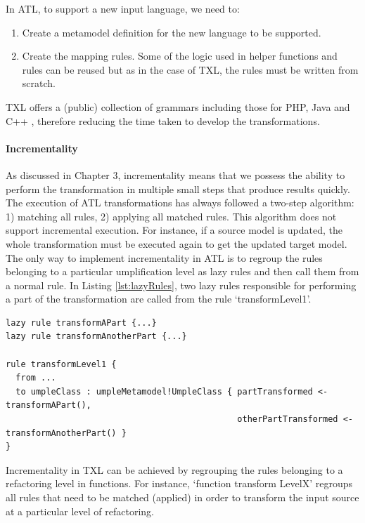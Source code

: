 In ATL, to support a new input language, we need to:
\begin{enumerate}
\item Create a metamodel definition for the new language to be supported.
\item Create the mapping rules. Some of the logic used in helper functions and rules can be reused but as in the case of TXL, the rules must be written from scratch.
\end{enumerate}

TXL offers a (public) collection of grammars including those for PHP, Java and C++ \cite{txlresources}, therefore reducing the time taken to develop the transformations. 

\paragraph*{Incrementality} 

As discussed in Chapter 3, incrementality means that we possess the ability to perform the transformation in multiple small steps that produce  results quickly. The execution of ATL transformations has always followed a two-step algorithm: 1) matching all rules, 2) applying all matched rules. This algorithm does not support incremental execution. For instance, if a source model is updated, the whole transformation must be executed again to get the updated target model. The only way to implement incrementality in ATL is to regroup the rules belonging to a particular umplification level as lazy rules and then call them from a normal rule. In Listing \ref{lst:lazyRules}, two lazy rules responsible for performing a part of the transformation are called from the rule `transformLevel1'.

\begin{lstlisting}[style=umplePlain, label=lst:lazyRules, caption=Calling lazy rules] 
lazy rule transformAPart {...}
lazy rule transformAnotherPart {...}

rule transformLevel1 {
  from ...
  to umpleClass : umpleMetamodel!UmpleClass { partTransformed <- transformAPart(),
                                              otherPartTransformed <- transformAnotherPart() }
}
\end{lstlisting}

Incrementality in TXL can be achieved  by regrouping the rules belonging to a refactoring level in functions. For instance, `function transform LevelX' regroups all rules that need to be matched (applied) in order to transform the input source at a particular level of refactoring. 

